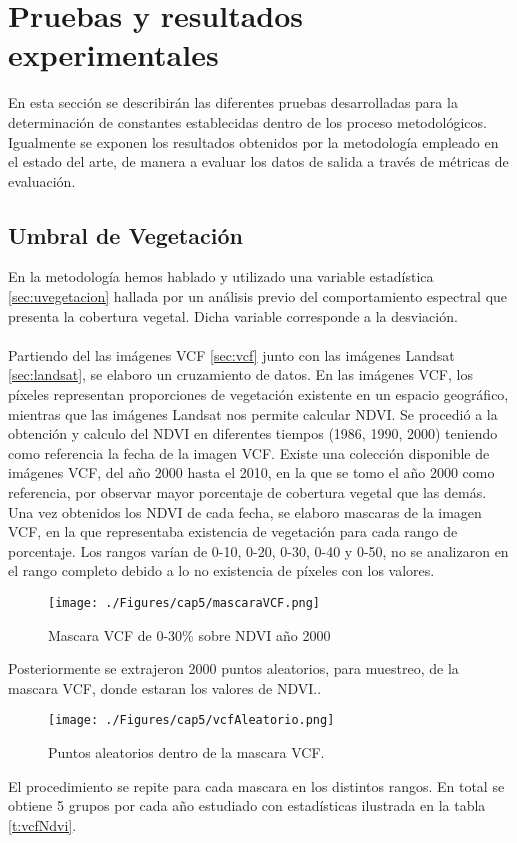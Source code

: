 \section{Pruebas y resultados experimentales}
En esta secci\'on se describir\'an las diferentes pruebas desarrolladas para la determinaci\'on de constantes establecidas dentro de los proceso metodol\'ogicos. Igualmente se exponen los resultados obtenidos por la metodolog\'ia empleado en el estado del arte, de manera a evaluar los datos de salida a trav\'es de m\'etricas de evaluaci\'on.
\subsection{Umbral de Vegetaci\'on}\label{subsec:umbralVegetacion}
En la metodolog\'ia hemos hablado y utilizado una variable estad\'istica \ref{sec:uvegetacion} hallada por un an\'alisis previo del comportamiento espectral que presenta la cobertura vegetal. Dicha variable corresponde a la desviaci\'on.\\~\\
Partiendo del las im\'agenes VCF \ref{sec:vcf} junto con las im\'agenes Landsat \ref{sec:landsat}, se elaboro un cruzamiento de datos. En las im\'agenes VCF, los p\'ixeles representan proporciones de vegetaci\'on existente en un espacio geogr\'afico, mientras que las im\'agenes Landsat nos permite calcular NDVI. Se procedi\'o a la obtenci\'on y calculo del NDVI en diferentes tiempos (1986, 1990, 2000) teniendo como referencia la fecha de la imagen VCF. Existe una colecci\'on disponible de im\'agenes VCF, del a\~{n}o 2000 hasta el 2010, en la que se tomo el a\~{n}o 2000 como referencia, por observar mayor porcentaje de cobertura vegetal que las dem\'as. Una vez obtenidos los NDVI de cada fecha, se elaboro mascaras de la imagen VCF, en la que representaba existencia de vegetaci\'on para cada rango de porcentaje. Los rangos var\'ian de 0-10, 0-20, 0-30, 0-40 y 0-50, no se analizaron en el rango completo debido a lo no existencia de p\'ixeles con los valores.
\begin{figure}[H]
	\centering
	\texttt{[image: ./Figures/cap5/mascaraVCF.png]}
	\caption{Mascara VCF de 0-30\% sobre NDVI a\~{n}o 2000}
	\label{fig:mascVCf}
\end{figure}
Posteriormente se extrajeron 2000 puntos aleatorios, para muestreo, de la mascara VCF, donde estaran los valores de NDVI..
\begin{figure}[H]
	\centering
	\texttt{[image: ./Figures/cap5/vcfAleatorio.png]}
	\caption{Puntos aleatorios dentro de la mascara VCF.}
	\label{fig:aleatorioVCf}
\end{figure}
El procedimiento se repite para cada mascara en los distintos rangos. En total se obtiene 5 grupos por cada a\~{n}o estudiado con estad\'isticas ilustrada en la tabla \ref{t:vcfNdvi}.

